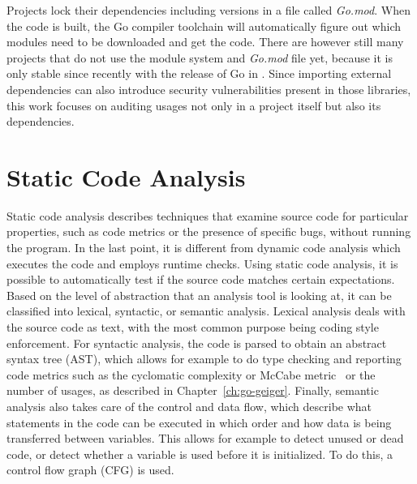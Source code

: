 

Projects lock their dependencies including versions in a file called \textit{Go.mod}.
When the code is built, the Go compiler toolchain will automatically figure out which modules need to be downloaded and
get the code.
There are however still many projects that do not use the module system and \textit{Go.mod} file yet, because it is only
stable since recently with the release of Go  in .
Since importing external dependencies can also introduce security vulnerabilities present in those libraries, this work
focuses on auditing \unsafe{} usages not only in a project itself but also its dependencies.



\section{Static Code Analysis}\label{sec:background:static-code-analysis}

Static code analysis describes techniques that examine source code for particular properties, such as code metrics or
the presence of specific bugs, without running the program.
In the last point, it is different from dynamic code analysis which executes the code and employs runtime checks.
Using static code analysis, it is possible to automatically test if the source code matches certain expectations.
Based on the level of abstraction that an analysis tool is looking at, it can be classified into lexical, syntactic,
or semantic analysis.
Lexical analysis deals with the source code as text, with the most common purpose being coding style enforcement.
For syntactic analysis, the code is parsed to obtain an abstract syntax tree (\acrshort{AST}), which allows for example
to do type checking and reporting code metrics such as the cyclomatic complexity or McCabe metric~\cite{watson1996} or
the number of \unsafe{} usages, as described in Chapter~\ref{ch:go-geiger}.
Finally, semantic analysis also takes care of the control and data flow, which describe what statements in the code can
be executed in which order and how data is being transferred between variables.
This allows for example to detect unused or dead code, or detect whether a variable is used before it is initialized.
To do this, a control flow graph (\acrshort{CFG}) is used.


